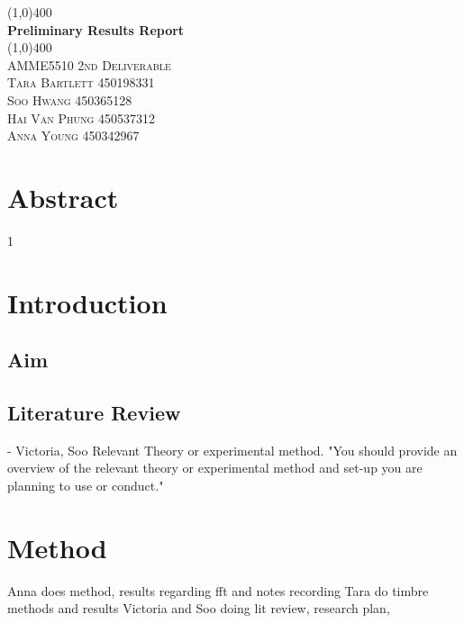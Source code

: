 \documentclass{article}
\begin{document}
\begin{titlepage}
	
\end{titlepage}
\cleardoublepage	
\begin{titlepage}
	\begin{center}
		
		\vspace{2cm}
		\line(1,0){400}\\
		[1cm]
		\huge{\bfseries Preliminary Results Report}\\
		[2mm]
		\line(1,0){400}\\
		[1.5cm]
		\textsc{\LARGE AMME5510 2nd Deliverable}\\
	\vspace{11.75cm}
		\textsc{\large Tara Bartlett 450198331}\\
		\textsc{\large Soo Hwang 450365128}\\
		\textsc{\large  Hai Van Phung 450537312}\\
		\textsc{\large Anna Young 450342967}
		
	\end{center}
\end{titlepage}


\section{Abstract}

\tableofcontents
\cleardoublepage


\setcounter{page}1

\newpage

\section{Introduction}

\subsection{Aim}

\newpage
\subsection{Literature Review} - Victoria, Soo
Relevant Theory or experimental method. "You should provide an overview of the relevant theory or experimental method and set-up you are planning to use or conduct."
\section{Method}
Anna does method, results regarding fft and notes recording
Tara do timbre methods and results
Victoria and Soo doing lit review, research plan,
\end{document}
